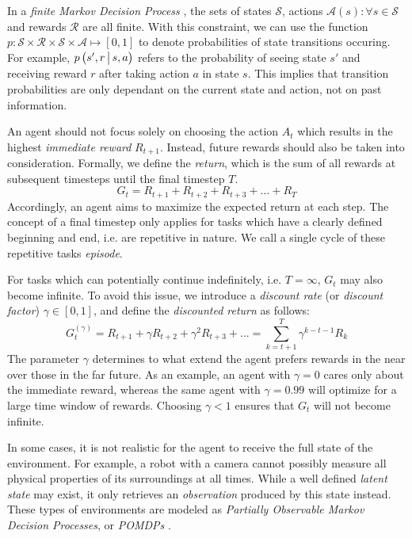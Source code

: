 In a \textit{finite Markov Decision Process} \cite{bible}, the sets of states $\mathscr{S}$, actions $\mathscr{A}(s) : \forall s \in \mathscr{S}$ and rewards $\mathscr{R}$ are all finite. With this constraint, we can use the function $p : \mathscr{S} \times \mathscr{R} \times \mathscr{S} \times \mathscr{A} \mapsto \left[0, 1\right]$ to denote probabilities of state transitions occuring. For example, $p\left(s', r \,\middle|\, s, a\right)$ refers to the probability of seeing state $s'$ and receiving reward $r$ after taking action $a$ in state $s$. This implies that transition probabilities are only dependant on the current state and action, not on past information.

An agent should not focus solely on choosing the action $A_t$ which results in the highest \textit{immediate reward} $R_{t+1}$. Instead, future rewards should also be taken into consideration. Formally, we define the \textit{return}, which is the sum of all rewards at subsequent timesteps until the final timestep $T$.
\begin{equation*}
    G_t = R_{t+1} + R_{t+2} + R_{t+3} + ... + R_T
\end{equation*}
Accordingly, an agent aims to maximize the expected return at each step. The concept of a final timestep only applies for tasks which have a clearly defined beginning and end, i.e. are repetitive in nature. We call a single cycle of these repetitive tasks \textit{episode}.

For tasks which can potentially continue indefinitely, i.e. $T = \infty$, $G_t$ may also become infinite. To avoid this issue, we introduce a \textit{discount rate} (or \textit{discount factor}) $\gamma \in [0, 1]$, and define the \textit{discounted return} as follows:
\begin{equation*}
    G_t^{(\gamma)} = R_{t+1} + \gamma R_{t+2} + \gamma^2 R_{t+3} + ...
        = \sum_{k=t+1}^T \gamma^{k-t-1} R_k
\end{equation*}
The parameter $\gamma$ determines to what extend the agent prefers rewards in the near over those in the far future. As an example, an agent with $\gamma = 0$ cares only about the immediate reward, whereas the same agent with $\gamma = 0.99$ will optimize for a large time window of rewards. Choosing $\gamma < 1$ ensures that $G_t$ will not become infinite.

In some cases, it is not realistic for the agent to receive the full state of the environment. For example, a robot with a camera cannot possibly measure all physical properties of its surroundings at all times. While a well defined \textit{latent state} may exist, it only retrieves an \textit{observation} produced by this state instead. These types of environments are modeled as \textit{Partially Observable Markov Decision Processes}, or \textit{POMDPs} \cite{bible}.